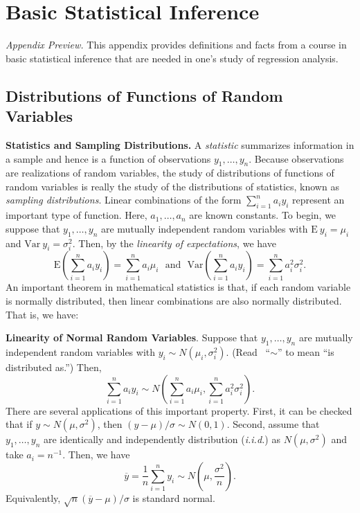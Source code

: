 
\appendix
\chapter{Basic Statistical Inference}

\vspace{-1.5in}

{\small \textit{Appendix Preview.} This appendix provides
definitions and facts from a course in basic statistical inference
that are needed in one's study of regression analysis.}

\bigskip

\section{Distributions of Functions of Random
Variables}

\textbf{Statistics and Sampling Distributions.} A \emph{statistic}
summarizes information in a sample and hence is a function of
observations $ y_1,\ldots,y_n$. Because observations are
realizations of random variables, the study of distributions of
functions of random variables is really the study of the
distributions of statistics, known as \emph{sampling distributions}.
Linear combinations of the form $\sum_{i=1}^n a_i y_i$ represent an
important type of function. Here,  $a_1,\ldots,a_n$ are known
constants. To begin, we suppose that $y_1,\ldots,y_n$ are mutually
independent random variables with $\mathrm{E~}y_i = \mu_i$ and
$\mathrm{ Var~}y_i = \sigma_i^2.$ Then, by the \emph{linearity of
expectations}, we have
\begin{equation*}
\mathrm{E}\left( \sum_{i=1}^n a_i y_i \right) = \sum_{i=1}^n a_i
\mu_i~~~\mathrm{and}~~~\mathrm{Var}\left( \sum_{i=1}^n a_i y_i
\right) = \sum_{i=1}^n a_i^2 \sigma_i^2.
\end{equation*}
An important theorem in mathematical statistics is that, if each
random variable is normally distributed, then linear combinations
are also normally distributed. That is, we
have:

\textbf{Linearity of Normal Random Variables}. Suppose that
$y_1,\ldots,y_n$ are mutually independent random variables with
$y_i\sim N(\mu_i,\sigma_i^2)$. (Read \ ``$\sim $'' to mean ``is
distributed as.'') Then,
\begin{equation*}
\sum_{i=1}^n a_i y_i \sim N\left( \sum_{i=1}^n a_i \mu_i,
\sum_{i=1}^n a_i^2 \sigma_i^2 \right) .
\end{equation*}
There are several applications of this important property. First, it
can be checked that if $y \sim N(\mu ,\sigma ^2)$, then $(y - \mu)/
\sigma \sim N(0,1)$. Second, assume that $y_1,\ldots,y_n$ are
identically and independently distribution (\emph{i.i.d.}) as
$N(\mu, \sigma ^2)$ and take $a_i=n^{-1}$. Then, we have
\begin{equation*}
\overline{y} = \frac{1}{n}\sum_{i=1}^n y_i \sim N\left( \mu
,\frac{\sigma ^2}{n}\right) .
\end{equation*}
Equivalently, $\sqrt{n}\left( \overline{y}-\mu \right) /\sigma $ is standard
normal.

